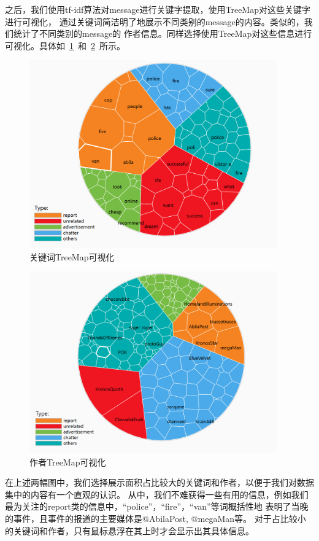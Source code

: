 \documentclass[a4paper]{article}
\begin{document}
之后，我们使用tf-idf算法对message进行关键字提取，使用TreeMap对这些关键字进行可视化，
通过关键词简洁明了地展示不同类别的message的内容。类似的，我们统计了不同类别的message的
作者信息。同样选择使用TreeMap对这些信息进行可视化。具体如~\ref{fig:1-keyword}~和~\ref{fig:1-author}~所示。
\begin{figure}[H]
  \centering
  \includegraphics[width=0.95\textwidth]{images/1-keyword.png}
  \caption{关键词TreeMap可视化}\label{fig:1-keyword}
  \vspace{\baselineskip}
\end{figure}
\begin{figure}[H]
  \centering
  \includegraphics[width=0.95\textwidth]{images/1-author.png}
  \caption{作者TreeMap可视化}\label{fig:1-author}
  \vspace{\baselineskip}
\end{figure}
在上述两幅图中，我们选择展示面积占比较大的关键词和作者，以便于我们对数据集中的内容有一个直观的认识。
从中，我们不难获得一些有用的信息，例如我们最为关注的report类的信息中，“police”，“fire”，“van”等词概括性地
表明了当晚的事件，且事件的报道的主要媒体是@AbilaPost, @megaMan等。
对于占比较小的关键词和作者，只有鼠标悬浮在其上时才会显示出其具体信息。
\end{document}
